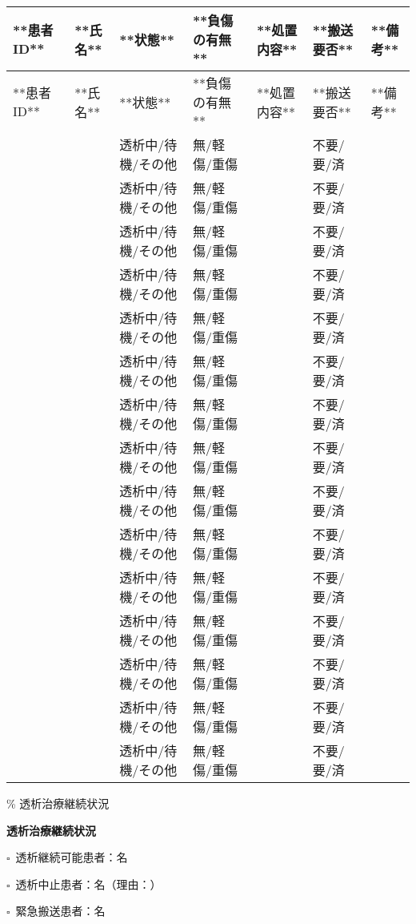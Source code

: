 \documentclass[
  japanese,
]{jarticle}
\newcommand{\checkbox}{$\square$\ }
\newcommand{\underlinespace}[1]{\underline{\hspace{#1}}}
\begin{document}
\begin{longtable*}{|p{1.8cm}|p{2.2cm}|p{2cm}|p{2cm}|p{2.2cm}|p{1.8cm}|p{2cm}|}
\hline
**患者ID** & **氏名** & **状態** & **負傷の有無** & **処置内容** & **搬送要否** & **備考** \\
\hline
\endfirsthead

\hline
**患者ID** & **氏名** & **状態** & **負傷の有無** & **処置内容** & **搬送要否** & **備考** \\
\hline
\endhead

 &  & 透析中/待機/その他 & 無/軽傷/重傷 &  & 不要/要/済 &  \\
\hline
 &  & 透析中/待機/その他 & 無/軽傷/重傷 &  & 不要/要/済 &  \\
\hline
 &  & 透析中/待機/その他 & 無/軽傷/重傷 &  & 不要/要/済 &  \\
\hline
 &  & 透析中/待機/その他 & 無/軽傷/重傷 &  & 不要/要/済 &  \\
\hline
 &  & 透析中/待機/その他 & 無/軽傷/重傷 &  & 不要/要/済 &  \\
\hline
 &  & 透析中/待機/その他 & 無/軽傷/重傷 &  & 不要/要/済 &  \\
\hline
 &  & 透析中/待機/その他 & 無/軽傷/重傷 &  & 不要/要/済 &  \\
\hline
 &  & 透析中/待機/その他 & 無/軽傷/重傷 &  & 不要/要/済 &  \\
\hline
 &  & 透析中/待機/その他 & 無/軽傷/重傷 &  & 不要/要/済 &  \\
\hline
 &  & 透析中/待機/その他 & 無/軽傷/重傷 &  & 不要/要/済 &  \\
\hline
 &  & 透析中/待機/その他 & 無/軽傷/重傷 &  & 不要/要/済 &  \\
\hline
 &  & 透析中/待機/その他 & 無/軽傷/重傷 &  & 不要/要/済 &  \\
\hline
 &  & 透析中/待機/その他 & 無/軽傷/重傷 &  & 不要/要/済 &  \\
\hline
 &  & 透析中/待機/その他 & 無/軽傷/重傷 &  & 不要/要/済 &  \\
\hline
 &  & 透析中/待機/その他 & 無/軽傷/重傷 &  & 不要/要/済 &  \\
\hline
\end{longtable*}

\% 透析治療継続状況

\textbf{\large 透析治療継続状況}

\checkbox 透析継続可能患者：\underlinespace{2cm}名

\checkbox 透析中止患者：\underlinespace{2cm}名（理由：\underlinespace{6cm}）

\checkbox 緊急搬送患者：\underlinespace{2cm}名
\end{document}
